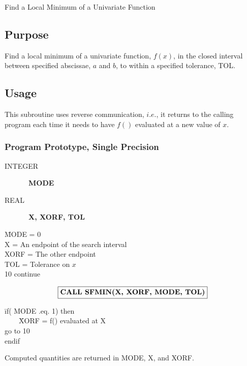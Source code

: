 \documentclass[twoside]{MATH77}
\begin{document}
 Find a Local Minimum of a Univariate Function


\subsection{Purpose}

Find a local minimum of a univariate function, $f(x)$, in the closed
interval between specified abscissae, $a$ and $b$, to within a specified
tolerance, TOL.

\subsection{Usage}

This subroutine uses reverse communication, $i.e.$, it returns to the
calling program each time it needs to have $f()$ evaluated at a new value of
$x.$

\subsubsection{Program Prototype, Single Precision}
\begin{description}
\item[INTEGER]  \ {\bf MODE}
\item[REAL]  \ {\bf X, XORF, TOL}
\end{description}
\begin{tabbing}
\hspace{.2in}\= MODE = 0\\
\>X = An endpoint of the search interval\\
\>XORF = The other endpoint\\
\>TOL = Tolerance on $x$\\
10\> continue
\end{tabbing}\vspace{-3pt}
$$
\fbox{{\bf CALL SFMIN(X, XORF, MODE, TOL)}}
$$
\begin{tabbing}
\hspace{.2in}\=if( MODE .eq. 1) then\\
\>\ \ \ \ \=XORF = f() evaluated at X\\
\>\>go to 10\\
\>endif
\end{tabbing}
Computed quantities are returned in MODE, X, and XORF.
\end{document}
